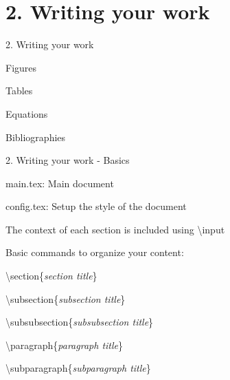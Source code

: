 \documentclass[13pt]{beamer}
\newcommand{\itemA}{\item[\textcolor{black}{\textbullet}]}
\newcommand{\itemB}{\item[\textcolor{black}{\textopenbullet}]}
\newcommand{\green}{\textcolor{colorgreen}}
\begin{document}
\section{2. Writing your work}

\begin{frame}{2. Writing your work}

 \begin{fullpageitemize}
    \itemA Figures
    \itemA Tables
    \itemA Equations
    \itemA Bibliographies
 \end{fullpageitemize}
\end{frame}

\begin{frame}{2. Writing your work - Basics}

 \begin{fullpageitemize}
    \itemA main.tex: Main document
    \itemA config.tex: Setup the style of the document
    \itemA The context of each section is included using \green{\textbackslash input}
    \itemA Basic commands to organize your content:\hfill \break
     \begin{fullpageitemize}
     {\footnotesize 
     \itemB \green{\textbackslash section}\{\textit{section title}\}
     \itemB \green{\textbackslash subsection}\{\textit{subsection title}\}
     \itemB \green{\textbackslash subsubsection}\{\textit{subsubsection title}\}
     \itemB \green{\textbackslash paragraph}\{\textit{paragraph title}\}
     \itemB \green{\textbackslash subparagraph}\{\textit{subparagraph title}\}
     }
     \end{fullpageitemize}
 \end{fullpageitemize}
\end{frame}
\end{document}
